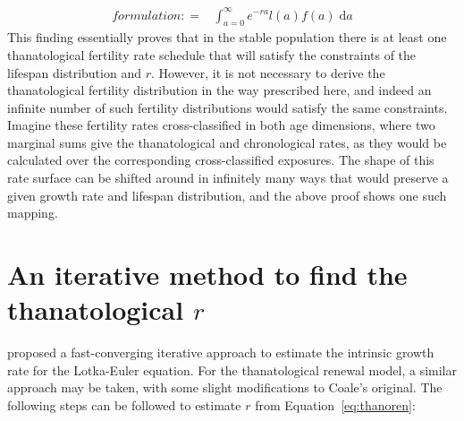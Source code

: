 \documentclass{article}
\newcommand{\dd}{\; \mathrm{d}}
\begin{document}
\begin{appendices}
\begin{align}
{formulation:} =& \int_{a=0}^\infty e^{-ra}l(a)f(a)
\dd a
\end{align}
This finding essentially proves that in the stable population there is at least
one thanatological fertility rate schedule that will satisfy the constraints of
the lifespan distribution and $r$. However, it is not necessary to derive the
thanatological fertility distribution in the way prescribed here, and indeed an
infinite number of such fertility distributions would satisfy the same
constraints. Imagine these fertility rates cross-classified in
both age dimensions, where two marginal sums give the thanatological and
chronological rates, as they would be calculated over the
corresponding cross-classified exposures. The shape of this rate surface can be
shifted around in infinitely many ways that would preserve a given growth rate
and lifespan distribution, and the above proof shows one such mapping.

\section{An iterative method to find the thanatological $r$}
\label{app:C}
\citet{coale1957new} proposed a fast-converging iterative approach to estimate
the intrinsic growth rate for the Lotka-Euler equation. For the thanatological
renewal model, a similar approach may be taken, with some slight
modifications to Coale's original.
The following steps can be followed to estimate $r$ from
Equation~\eqref{eq:thanoren}:


\end{appendices}
\end{document}

